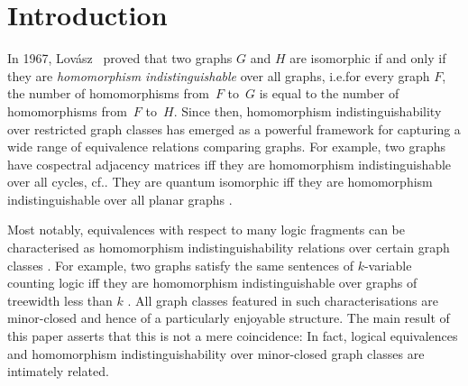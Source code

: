 \documentclass[3p,final]{elsarticle}
\begin{document}
	\section{Introduction}
	\label{sec:intro}
	


	In 1967, Lovász~\cite{lovasz_operations_1967} proved that two graphs $G$ and $H$ are isomorphic if and only if they are \emph{homomorphism indistinguishable} over all graphs, i.e.\@ for every graph $F$, the number of homomorphisms from~$F$ to~$G$ is equal to the number of homomorphisms from~$F$ to~$H$.
	Since then, homomorphism indistinguishability over restricted graph classes has emerged as a powerful framework for capturing a wide range of equivalence relations comparing graphs.
	For example, two graphs have cospectral adjacency matrices iff they are homomorphism indistinguishable over all cycles, cf.\@ \cite{dell_lovasz_2018}.
	They are quantum isomorphic iff they are homomorphism indistinguishable over all planar graphs \cite{mancinska_quantum_2019}.



	Most notably, equivalences with respect to many logic fragments can be characterised as homomorphism indistinguishability relations over certain graph classes \cite{grohe_counting_2020,dawar_lovasz-type_2021,montacute_pebble_2022,rattan_weisfeiler_2023}. 
	For example, two graphs satisfy the same sentences of $k$-variable counting logic iff they are homomorphism indistinguishable over graphs of treewidth less than $k$ \cite{dvorak_recognizing_2010}. 
	All graph classes featured in such characterisations are minor-closed and hence of a particularly enjoyable structure.
	The main result of this paper asserts that this is not a mere coincidence:
	In fact, logical equivalences and homomorphism indistinguishability over minor-closed graph classes are intimately related. 
	
\end{document}
